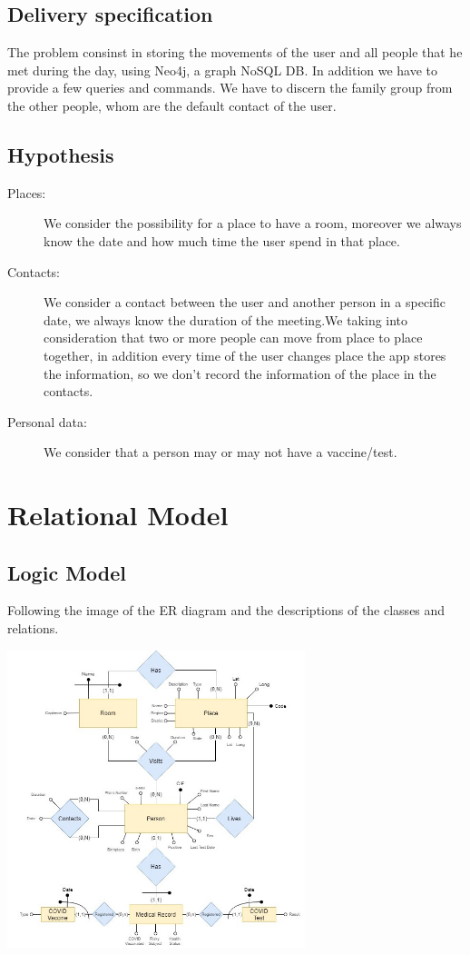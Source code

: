 \documentclass[table, 12pt]{article}
\begin{document}
\subsection{Delivery specification}
The problem consinst in storing the movements of the user and all people that he met during the day, using Neo4j, a graph NoSQL DB. In addition we have to provide a few queries and commands. We have to discern the family group from the other people, whom are the default contact of the user.

\subsection{Hypothesis }
\begin{description}

\item[Places:]We consider the possibility for a place to have a room, moreover we always know the date and how much time the user spend in that place.
\item[Contacts:]We consider a contact between the user and another person in a specific date, we always know the duration of the meeting.We taking into consideration that two or more people can move from place to place together, in addition every time of the user changes place the app stores the information, so we don't record the information of the place in the contacts. 
\item[Personal data:]
We consider that a person may or may not  have a vaccine/test.
\end{description} 


\section{Relational Model}
\subsection{Logic Model}
Following the image of the ER diagram and the descriptions of the classes and relations.
\begin{center}
\includegraphics[width=0.65\textwidth]{images/e.jpg} 
\end{center}
\end{document}
